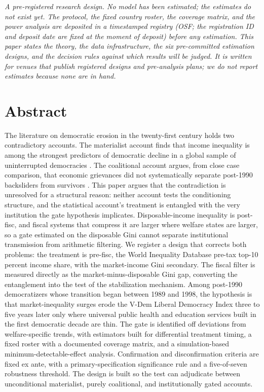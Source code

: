 
\emph{A pre-registered research design. No model has been estimated; the estimates do not exist yet. The protocol, the fixed country roster, the coverage matrix, and the power analysis are deposited in a timestamped registry (OSF; the registration ID and deposit date are fixed at the moment of deposit) before any estimation. This paper states the theory, the data infrastructure, the six pre-committed estimation designs, and the decision rules against which results will be judged. It is written for venues that publish registered designs and pre-analysis plans; we do not report estimates because none are in hand.}

\section*{Abstract}

The literature on democratic erosion in the twenty-first century holds two contradictory accounts. The materialist account finds that income inequality is among the strongest predictors of democratic decline in a global sample of uninterrupted democracies \citep{RauStokes2025}. The coalitional account argues, from close case comparison, that economic grievances did not systematically separate post-1990 backsliders from survivors \citep{HaggardKaufman2021}. This paper argues that the contradiction is unresolved for a structural reason: neither account tests the conditioning structure, and the statistical account's treatment is entangled with the very institution the gate hypothesis implicates. Disposable-income inequality is post-fisc, and fiscal systems that compress it are larger where welfare states are larger, so a gate estimated on the disposable Gini cannot separate institutional transmission from arithmetic filtering. We register a design that corrects both problems: the treatment is pre-fisc, the World Inequality Database pre-tax top-10 percent income share, with the market-income Gini secondary. The fiscal filter is measured directly as the market-minus-disposable Gini gap, converting the entanglement into the test of the stabilization mechanism. Among post-1990 democratizers whose transition began between 1989 and 1998, the hypothesis is that market-inequality surges erode the V-Dem Liberal Democracy Index three to five years later only where universal public health and education services built in the first democratic decade are thin. The gate is identified off deviations from welfare-specific trends, with estimators built for differential treatment timing, a fixed roster with a documented coverage matrix, and a simulation-based minimum-detectable-effect analysis. Confirmation and disconfirmation criteria are fixed ex ante, with a primary-specification significance rule and a five-of-seven robustness threshold. The design is built so the test can adjudicate between unconditional materialist, purely coalitional, and institutionally gated accounts.


